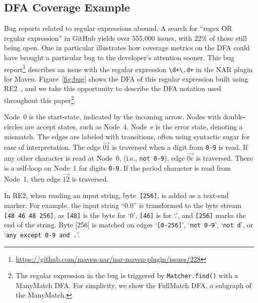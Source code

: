 

\subsection{DFA Coverage Example}
\label{sec:coverageexample}
Bug reports related to regular expressions abound. 
 A search for ``regex OR regular expression'' in GitHub yields over 555,000 issues, with 22\% of those still being open. 
 One in particular illustrates how coverage metrics on the DFA could have brought a particular bug to the developer's attention sooner. This bug report\footnote{\url{https://github.com/maven-nar/nar-maven-plugin/issues/228}} describes an issue with the regular expression \verb!\d+\.d+! in the NAR plugin for Maven. 
Figure~\ref{fig:bug} shows the DFA of this regular expression built using RE2~\cite{re2}, and we take this opportunity to describe the DFA notation used throughout this paper\footnote{The regular expression in the bug is triggered by {\tt Matcher.find()} with a ManyMatch DFA. For simplicity, we show the FullMatch DFA, a subgraph of the ManyMatch.}. 

Node~0 is the start-state, indicated by the incoming arrow. 
Nodes with double-circles are accept states, such as Node~4. 
Node~e is the error state, denoting a mismatch. 
The edges are labeled with transitions, often using syntactic sugar for ease of interpretation. 
The edge $\overrightarrow{01}$ is traversed when a digit from \verb!0-9! is read. 
If any other character is read at Node~0, (i.e., \verb!not 0-9!), edge $\overrightarrow{0e}$ is traversed. 
 There is a self-loop on Node~1 for digits \verb!0-9!. 
 If the period character is read from Node~1, then edge $\overrightarrow{12}$ is traversed. 

In RE2, when reading an input string, byte~{\tt [256]}, is added as a text-end marker. %
For example, the input string ``0.0'' is transformed to the byte stream {\tt [48 46 48 256]}, as {\tt [48]} is the byte for `0', {\tt [46]} is for `.', and {\tt [256]} marks the end of the string. Byte [256] is matched on edges  `\verb![0-256]!', `\verb!not 0-9!',  `\verb!not d!', or `\verb!any except 0-9 and .!'. 


